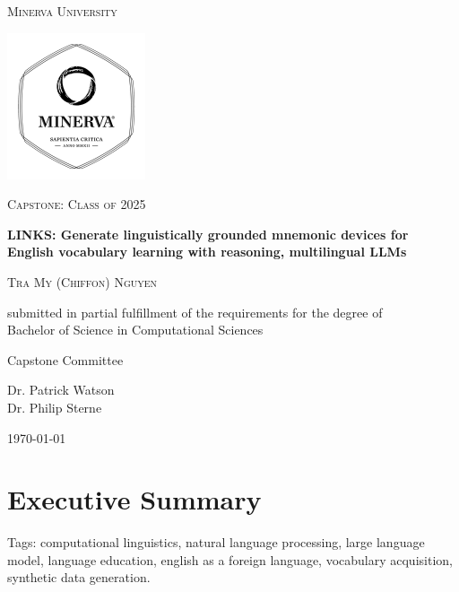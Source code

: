\begin{titlepage}
\centering
{\scshape\LARGE Minerva University \par}
\vspace{1cm}
\begin{center}
  \includegraphics[width=0.4\linewidth]{minerva/minerva_logo.pdf}
\end{center}
{\scshape\Large Capstone: Class of 2025 \par}
\vspace{1.5cm}
{\huge\bfseries LINKS: Generate linguistically grounded mnemonic devices for English vocabulary learning with reasoning, multilingual LLMs \par}
\vspace{2cm}
{\scshape\large Tra My (Chiffon) Nguyen \par}

\vfill
submitted in partial fulfillment of the requirements for the degree of \\ Bachelor of Science in Computational Sciences \par
\vspace{2cm}
{\large Capstone Committee \par}
Dr. Patrick Watson \\
Dr. Philip Sterne \\
\vspace{2cm}
{\large \today\par}
\end{titlepage}

\onecolumn
\section*{Executive Summary} \label{sec:exec-summary}

Tags: computational linguistics, natural language processing, large language model, language education, english as a foreign language, vocabulary acquisition, synthetic data generation.

